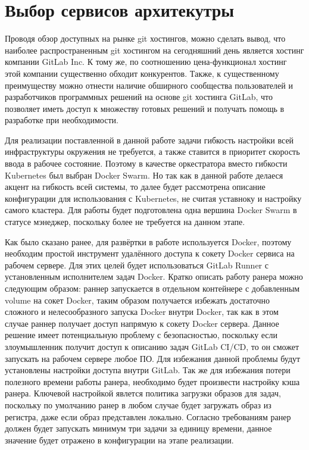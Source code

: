 \section{Выбор сервисов архитекутры}

Проводя обзор доступных на рынке git хостингов, можно сделать вывод, что наиболее распространенным git хостингом на сегодняшний день является хостинг компании GitLab Inc.
К тому же, по соотношению цена-функционал хостинг этой компании существенно обходит конкурентов.
Также, к существенному преимуществу можно отнести наличие обширного сообщества пользователей и разработчиков программных решений на основе git хостинга GitLab,
что позволяет иметь доступ к множеству готовых решений и получать помощь в разработке при необходимости.

Для реализации поставленной в данной работе задачи гибкость настройки всей инфраструктуры окружения не требуется, а также ставится в приоритет скорость ввода в рабочее состояние.
Поэтому в качестве оркестратора вместо гибкости Kubernetes был выбран Docker Swarm.
Но так как в данной работе делаеся акцент на гибкость всей системы, то далее будет рассмотрена описание конфигурации для использования с Kubernetes, не считая уставноку и настройку самого кластера.
Для работы будет подготовлена одна вершина Docker Swarm в статусе мэнеджер, поскольку более не требуется на данном этапе.

Как было сказано ранее, для развёртки в работе используется Docker, поэтому необходим простой инструмент удалённого доступа к сокету Docker сервиса на рабочем сервере.
Для этих целей будет использоваться GitLab Runner с установленным исполнителем задач Docker.
Кратко описать работу ранера можно следующим образом: раннер запускается в отдельном контейнере с добавленным volume на сокет Docker,
таким образом получается избежать достаточно сложного и нелесообразного запуска Docker внутри Docker,
так как в этом случае раннер получает доступ напрямую к сокету Docker сервера.
Данное решение имеет потенциальную проблему с безопасностью, поскольку если злоумышленник получит доступ к описанию задач GitLab CI/CD, то он сможет запускать на рабочем сервере любое ПО.
Для избежания данной проблемы будут установлены настройки доступа внутри GitLab.
Так же для избежания потери полезного времени работы ранера, необходимо будет произвести настройку кэша ранера.
Ключевой настройкой явлется политика загрузки образов для задач, поскольку по умолчанию ранер в любом случае будет загружать образ из регистра, даже если образ представлен локально.
Согласно требованиям ранер должен будет запускать минимум три задачи за единицу времени, данное значение будет отражено в конфигурации на этапе реализации.

